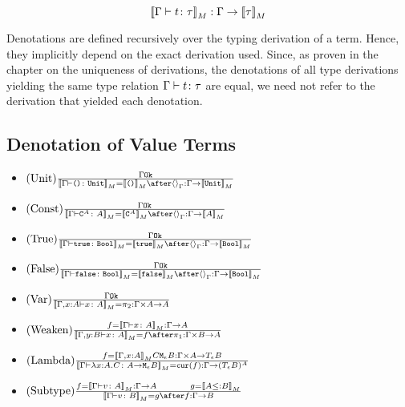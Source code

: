 \documentclass{report}
\begin{document}
$${\bf [\![}\Gamma \vdash t \colon \tau{\bf ]\!]}_M: \Gamma \rightarrow {\bf [\![}\tau{\bf ]\!]}_M$$

Denotations are defined recursively over the typing derivation of a term. Hence, they implicitly depend on the exact derivation used. Since, as proven in the chapter on the uniqueness of derivations, the denotations of all type derivations yielding the same type relation $\Gamma \vdash t \colon \tau$ are equal, we need not refer to the derivation that yielded each denotation.

\subsection{Denotation of Value Terms}
\begin{itemize}
    \item $\treerule{Unit}{\ok{\G}}{\deno{\typerelation{\G}{\u}{\U}} = \deno{\u} \after \term{\G} : \G \rightarrow \deno{\U}}$
        
    \item $\treerule{Const}{\ok{\G}}{\deno{\typerelation{\G}{\const{A}}{A}} = \deno{\const{A}} \after \term{\G} : \G \rightarrow \deno{A}}$
         
    \item $\treerule{True}{\ok{\G}}{\deno{\typerelation{\G}{\t}{\B}} = \deno{\t} \after \term{\G} : \G \rightarrow \deno{\B}}$
        
    \item $\treerule{False}{\ok{\G}}{\deno{\typerelation{\G}{\f}{\B}} = \deno{\f} \after \term{\G} : \G \rightarrow \deno{\B}}$
        
    \item $(\text{Var}) \frac{\Gamma \texttt{Ok}}{{\bf [\![}\Gamma, x: A \vdash x \colon A{\bf ]\!]}_M = \pi_2: \Gamma \times A \rightarrow A}$
    \item $\treerule{Weaken}{f = \deno{\gtyperelation{x}{A}}: \G \rightarrow A}{\deno{\typerelation{\gby}{x}{A}} = f \after \p: \G \times B \rightarrow A}$
    \item $(\text{Lambda}) \frac{f = {\bf [\![}\Gamma, x: A{\bf ]\!]}_M{C}{\texttt{M}_{\epsilon}{B}} : \Gamma \times A \rightarrow T_{\epsilon}{B}}{{\bf [\![}\Gamma \vdash \lambda x : A. C \colon A \rightarrow \texttt{M}_{\epsilon}{B}{\bf ]\!]}_M = \texttt{cur}(f) : \Gamma \rightarrow (T_{\epsilon}{B})^A}$
    
    \item $\treerule{Subtype}{f = \deno{\typerelation{\G}{v}{A}} : \G \rightarrow A\s\s g = \deno{A \subtype B}}{\deno{\typerelation{\G}{v}{B}} = g \after f : \G \rightarrow B}$
  
\end{itemize}
\end{document}
